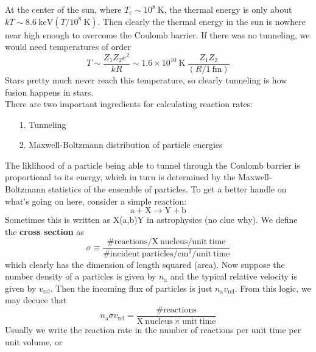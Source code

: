 \documentclass[10pt]{article}
\numberwithin{equation}{section}
\newcommand{\n}{\noindent}
\begin{document}
  At the center of the sun, where $T_c\sim 10^8\ \mathrm{K}$, the
  thermal energy is only about $kT\sim 8.6\ \mathrm{keV}\left(T/10^8\
    \mathrm{K}\right)$. Then clearly the thermal energy in the sun is
  nowhere near high enough to overcome the Coulomb barrier. If there
  was no tunneling, we would need temperatures of order 
  \begin{equation}
    \label{eq:101}
    T\sim\frac{Z_1Z_2e^2}{kR}\sim1.6\times 10^{10}\ \mathrm{K}\
    \frac{Z_1Z_2}{(R/1\ \mathrm{fm})}
  \end{equation}
  Stars pretty much never reach this temperature, so clearly tunneling
  is how fusion happens in stars.\\

  \n There are two important ingredients for calculating reaction
  rates:
  \begin{enumerate}
  \item[1.] Tunneling
  \item[2.] Maxwell-Boltzmann distribution of particle energies
  \end{enumerate}
  The liklihood of a particle being able to tunnel through the Coulomb
  barrier is proportional to its energy, which in turn is determined
  by the Maxwell-Boltzmann statistics of the ensemble of particles. To
  get a better handle on what's going on here, consider a simple
  reaction:
  \begin{equation}
    \label{eq:102}
    \mathrm{a+X\to Y+b}
  \end{equation}
  Sometimes this is written as X(a,b)Y in astrophysics (no clue
  why). We define the \textbf{cross section} as 
  \begin{equation}
    \label{eq:103}
    \sigma \equiv \frac{\mathrm{\# reactions/X\ nucleus/unit\
        time}}{\mathrm{\#incident\ particles/cm^2/unit\ time}}
  \end{equation}
  which clearly has the dimension of length squared (area). Now
  suppose the number density of a particles is given by $n_\mathrm{a}$
  and the typical relative velocity is given by
  $v_{\mathrm{rel}}$. Then the incoming flux of particles is just
  $n_\mathrm{a}v_{\mathrm{rel}}$. From this logic, we may decuce that
  \begin{equation}
    \label{eq:104}
    n_\mathrm{a}\sigma
    v_{\mathrm{rel}}=\frac{\mathrm{\#reactions}}{\mathrm{X\ nucleus\times
        unit\ time}}
  \end{equation}
  Usually we write the reaction rate in the number of reactions per
  unit time per unit volume, or
\end{document}
